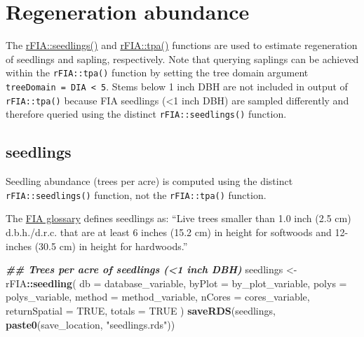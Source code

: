 \documentclass[
]{book}
\newenvironment{Shaded}{\begin{snugshade}}{\end{snugshade}}
\newcommand{\AttributeTok}[1]{\textcolor[rgb]{0.13,0.29,0.53}{#1}}
\newcommand{\ConstantTok}[1]{\textcolor[rgb]{0.56,0.35,0.01}{#1}}
\newcommand{\DocumentationTok}[1]{\textcolor[rgb]{0.56,0.35,0.01}{\textbf{\textit{#1}}}}
\newcommand{\FunctionTok}[1]{\textcolor[rgb]{0.13,0.29,0.53}{\textbf{#1}}}
\newcommand{\NormalTok}[1]{#1}
\newcommand{\OtherTok}[1]{\textcolor[rgb]{0.56,0.35,0.01}{#1}}
\newcommand{\SpecialCharTok}[1]{\textcolor[rgb]{0.81,0.36,0.00}{\textbf{#1}}}
\newcommand{\StringTok}[1]{\textcolor[rgb]{0.31,0.60,0.02}{#1}}
\begin{document}
\hypertarget{regeneration-abundance}{%
\section{Regeneration abundance}\label{regeneration-abundance}}

The \href{https://rdrr.io/cran/rFIA/man/seedling.html}{rFIA::seedlings()} and \href{https://rdrr.io/cran/rFIA/man/tpa.html}{rFIA::tpa()} functions are used to estimate regeneration of seedlings and sapling, respectively. Note that querying saplings can be achieved within the \texttt{rFIA::tpa()} function by setting the tree domain argument \texttt{treeDomain\ =\ DIA\ \textless{}\ 5}. Stems below 1 inch DBH are not included in output of \texttt{rFIA::tpa()} because FIA seedlings (\textless1 inch DBH) are sampled differently and therefore queried using the distinct \texttt{rFIA::seedlings()} function.

\hypertarget{seedlings}{%
\subsection{seedlings}\label{seedlings}}

Seedling abundance (trees per acre) is computed using the distinct \texttt{rFIA::seedlings()} function, not the \texttt{rFIA::tpa()} function.

The \href{https://www.fs.usda.gov/research/understory/forest-inventory-and-analysis-glossary-standard-terminology}{FIA glossary} defines seedlings as: ``Live trees smaller than 1.0 inch (2.5 cm) d.b.h./d.r.c. that are at least 6 inches (15.2 cm) in height for softwoods and 12-inches (30.5 cm) in height for hardwoods.''

\begin{Shaded}
\begin{Highlighting}[]
\DocumentationTok{\#\# Trees per acre of seedlings (\textless{}1 inch DBH)}
\NormalTok{seedlings }\OtherTok{\textless{}{-}}\NormalTok{ rFIA}\SpecialCharTok{::}\FunctionTok{seedling}\NormalTok{(}
  \AttributeTok{db =}\NormalTok{ database\_variable,}
  \AttributeTok{byPlot =}\NormalTok{ by\_plot\_variable,}
  \AttributeTok{polys =}\NormalTok{ polys\_variable,}
  \AttributeTok{method =}\NormalTok{ method\_variable,}
  \AttributeTok{nCores =}\NormalTok{ cores\_variable,}
  \AttributeTok{returnSpatial =} \ConstantTok{TRUE}\NormalTok{,}
  \AttributeTok{totals =} \ConstantTok{TRUE}
\NormalTok{) }
\FunctionTok{saveRDS}\NormalTok{(seedlings, }\FunctionTok{paste0}\NormalTok{(save\_location, }\StringTok{"seedlings.rds"}\NormalTok{))}
\end{Highlighting}
\end{Shaded}
\end{document}
